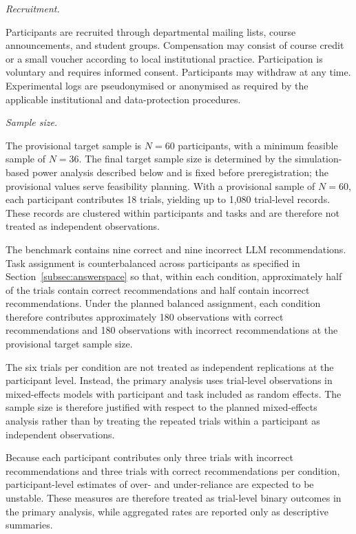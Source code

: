 \documentclass[oneside,final,14pt,a4paper]{extreport}
\begin{document}
\emph{Recruitment.}

Participants are recruited through departmental mailing lists, course
announcements, and student groups. Compensation may consist of course credit
or a small voucher according to local institutional practice. Participation is
voluntary and requires informed consent. Participants may withdraw at any
time. Experimental logs are pseudonymised or anonymised as required by the
applicable institutional and data-protection procedures.

\emph{Sample size.}

The provisional target sample is $N=60$ participants, with a minimum feasible
sample of $N=36$. The final target sample size is determined by the
simulation-based power analysis described below and is fixed before
preregistration; the provisional values serve feasibility planning. 
With a provisional sample of \(N=60\), each participant contributes 18 trials,
yielding up to 1,080 trial-level records. These records are clustered 
within participants and tasks and are therefore not treated as independent 
observations.

The benchmark contains nine correct and nine incorrect LLM recommendations.
Task assignment is counterbalanced across participants as specified in
Section~\ref{subsec:answerspace} so that, within each condition,
approximately half of the trials contain correct recommendations and half
contain incorrect recommendations. Under the planned balanced assignment,
each condition therefore contributes approximately 180 observations with
correct recommendations and 180 observations with incorrect recommendations
at the provisional target sample size.

The six trials per condition are not treated as independent replications at
the participant level. Instead, the primary analysis uses trial-level
observations in mixed-effects models with participant and task included as
random effects. The sample size is therefore justified with respect to the
planned mixed-effects analysis rather than by treating the repeated trials
within a participant as independent observations.

Because each participant contributes only three trials with incorrect
recommendations and three trials with correct recommendations per condition,
participant-level estimates of over- and under-reliance are expected to be
unstable. These measures are therefore treated as trial-level binary
outcomes in the primary analysis, while aggregated rates are reported only
as descriptive summaries.
\end{document}
